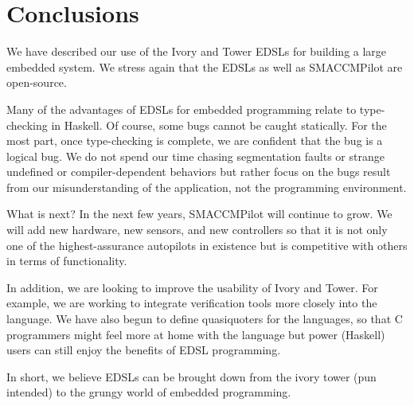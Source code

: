 \section{Conclusions}
\label{sec:conclusions}

We have described our use of the Ivory and Tower EDSLs for building a large
embedded system.  We stress again that the EDSLs as well as SMACCMPilot are
open-source.

Many of the advantages of EDSLs for embedded programming relate to type-checking
in Haskell.  Of course, some bugs cannot be caught statically.  For the most part,
once type-checking is complete, we are confident that the bug is a logical bug.
We do not spend our time chasing segmentation faults or strange undefined or
compiler-dependent behaviors but rather focus on the bugs result from our
misunderstanding of the application, not the programming environment.

What is next?  In the next few years, SMACCMPilot will continue to grow.  We
will add new hardware, new sensors, and new controllers so that it is not only
one of the highest-assurance autopilots in existence but is competitive with
others in terms of functionality.

In addition, we are looking to improve the usability of Ivory and Tower.  For
example, we are working to integrate verification tools more closely into the
language.  We have also begun to define quasiquoters for the languages, so that
C programmers might feel more at home with the language but power (Haskell)
users can still enjoy the benefits of EDSL programming.

In short, we believe EDSLs can be brought down from the ivory tower (pun
intended) to the grungy world of embedded programming.






